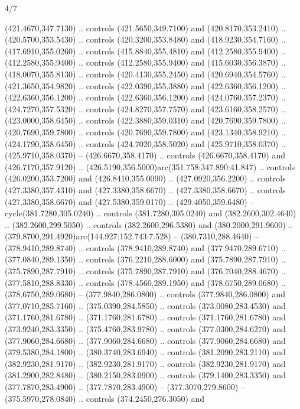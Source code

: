 \begin{flagdescription}{4/7}
\begin{scope}[shift={(0.5\flaglength,0.5\flagwidth)},scale=\flagwidth*\stretchfactor/820]
\begin{scope}[scale=1.87,xshift=-138mm,yshift=75mm]
\begin{scope}[y=0.8pt, x=0.8pt, yscale=-1, xscale=1]
\begin{scope}[fill=c9ca168]
  (421.4670,347.7130) .. controls (421.5650,349.7100) and (420.8170,353.2410) ..
  (420.5700,353.5430) .. controls (420.3200,353.8480) and (418.9230,354.7160) ..
  (417.6910,355.0260) .. controls (415.8840,355.4810) and (412.2580,355.9400) ..
  (412.2580,355.9400) .. controls (412.2580,355.9400) and (415.6030,356.3870) ..
  (418.0070,355.8130) .. controls (420.4130,355.2450) and (420.6940,354.5760) ..
  (421.3650,354.9820) .. controls (422.0390,355.3880) and (422.6360,356.1200) ..
  (422.6360,356.1200) .. controls (422.6360,356.1200) and (424.0760,357.2370) ..
  (424.7270,357.5320) .. controls (424.8270,357.7570) and (423.6160,358.2570) ..
  (423.0000,358.6450) .. controls (422.3880,359.0310) and (420.7690,359.7800) ..
  (420.7690,359.7800) .. controls (420.7690,359.7800) and (423.1340,358.9210) ..
  (424.1790,358.6450) .. controls (424.7020,358.5020) and (425.9710,358.0370) ..
  (425.9710,358.0370) -- (426.6670,358.4170) .. controls (426.6670,358.4170) and
  (426.7170,357.9120) .. (426.5190,356.5000)arc(351.758:347.890:41.847) ..
  controls (426.0200,353.7200) and (426.8410,355.0090) .. (427.0920,356.2200) ..
  controls (427.3380,357.4310) and (427.3380,358.6670) .. (427.3380,358.6670) ..
  controls (427.3380,358.6670) and (427.5380,359.0170) .. (429.4050,359.6480) --
  cycle(381.7280,305.0240) .. controls (381.7280,305.0240) and
  (382.2600,302.4640) .. (382.2600,299.5050) .. controls (382.2600,296.5380) and
  (380.2000,291.9600) .. (379.8700,291.4920)arc(144.927:152.743:7.528) --
  (380.7310,288.4640) -- (378.9410,289.8740) .. controls (378.9410,289.8740) and
  (377.9470,289.6710) .. (377.0840,289.1350) .. controls (376.2210,288.6000) and
  (375.7890,287.7910) .. (375.7890,287.7910) .. controls (375.7890,287.7910) and
  (376.7040,288.4670) .. (377.5810,288.8330) .. controls (378.4560,289.1950) and
  (378.6750,289.0680) .. (378.6750,289.0680) -- (377.9840,286.0800) .. controls
  (377.9840,286.0800) and (377.0710,285.7160) .. (375.0390,284.5850) .. controls
  (373.0080,283.4530) and (371.1760,281.6780) .. (371.1760,281.6780) .. controls
  (371.1760,281.6780) and (373.9240,283.3350) .. (375.4760,283.9780) .. controls
  (377.0300,284.6270) and (377.9060,284.6680) .. (377.9060,284.6680) .. controls
  (377.9060,284.6680) and (379.5380,284.1800) .. (380.3740,283.6940) .. controls
  (381.2090,283.2110) and (382.9230,281.9170) .. (382.9230,281.9170) .. controls
  (382.9230,281.9170) and (381.2900,282.8480) .. (380.2150,283.0900) .. controls
  (379.1400,283.3350) and (377.7870,283.4900) .. (377.7870,283.4900) --
  (377.3070,279.8600) -- (375.5970,278.0840) .. controls (374.2450,276.3050) and

\end{scope}
\end{scope}
\end{scope}
\end{scope}
\end{flagdescription}

